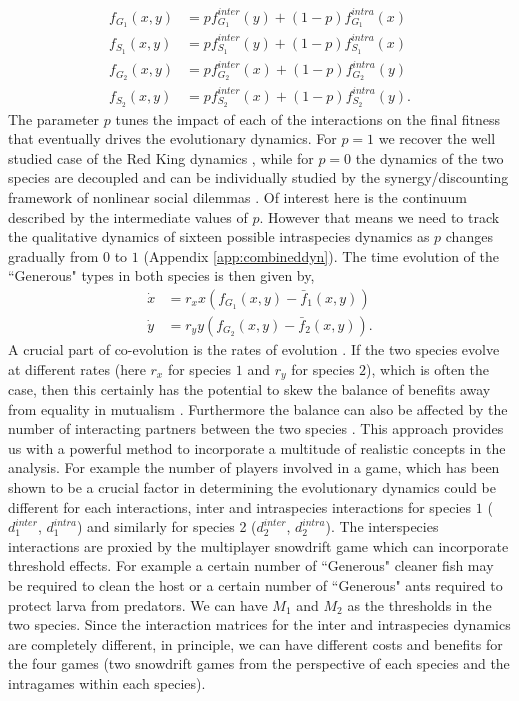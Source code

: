 \documentclass[12pt]{article}
\begin{document}
%
\begin{align}
	f_{G_1} (x,y) &= p f^{inter}_{G_1} (y) + (1-p) f^{intra}_{G_1} (x) \\
	f_{S_1} (x,y) &= p f^{inter}_{S_1} (y) + (1-p) f^{intra}_{S_1} (x)  \\
	f_{G_2} (x,y) &= p f^{inter}_{G_2} (x) + (1-p) f^{intra}_{G_2} (y) \\
	f_{S_2} (x,y) &= p f^{inter}_{S_2} (x) + (1-p) f^{intra}_{S_2} (y).
\label{eq:combinedfiteqs}
\end{align}
%
The parameter $p$ tunes the impact of each of the interactions on the final fitness that eventually drives the evolutionary dynamics.
For $p=1$ we recover the well studied case of the Red King dynamics \citep{gokhale:PRSB:2012}, while for $p=0$ the dynamics of the two species are  decoupled and can be individually studied by the synergy/discounting framework of nonlinear social dilemmas \citep{hauert:JTB:2006a}.
Of interest here is the continuum described by the intermediate values of $p$.
However that means we need to track the qualitative dynamics of sixteen possible intraspecies dynamics as $p$ changes gradually from $0$ to $1$ (Appendix \ref{app:combineddyn}). 
The time evolution of the ``Generous" types in both species is then given by,
%
\begin{align}
\dot{x} &= r_x x \left(f_{G_1}(x,y) -  \bar{f}_1(x,y) \right)  \\
\dot{y} &= r_y y \left(f_{G_2}(x,y) -  \bar{f}_2(x,y) \right).
\label{eq:repeq}
\end{align}
%
A crucial part of co-evolution is the rates of evolution \citep{salathe:TREE:2008}.
If the two species evolve at different rates (here $r_x$ for species $1$ and $r_y$ for species $2$), which is often the case, then this certainly has the potential to skew the balance of benefits away from equality in mutualism \citep{bergstrom:PNAS:2003}.
Furthermore the balance can also be affected by the number of interacting partners between the two species \citep{gokhale:PRSB:2012}.
This approach provides us with a powerful method to incorporate a multitude of realistic concepts in the analysis.
For example the number of players involved in a game, which has been shown to be a crucial factor in determining the evolutionary dynamics could be different for each interactions, inter and intraspecies interactions for species $1$ ($d^{inter}_1$, $d^{intra}_1$) and similarly for species 2 ($d^{inter}_2$, $d^{intra}_2$). 
The interspecies interactions are proxied by the multiplayer snowdrift game which can incorporate threshold effects.
For example a certain number of ``Generous" cleaner fish may be required to clean the host or a certain number of ``Generous" ants required to protect larva from predators.
We can have $M_1$ and $M_2$ as the thresholds in the two species.
Since the interaction matrices for the inter and intraspecies dynamics are completely different, in principle, we can have different costs and benefits for the four games (two snowdrift games from the perspective of each species and the intragames within each species).
\end{document}
